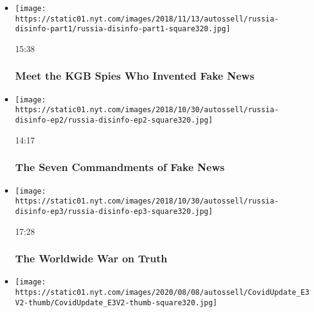 \begin{itemize}
\item
  \href{https://www.nytimes.com/video/opinion/100000006210828/russia-disinformation-fake-news.html?action=click\&module=video-series-bar\&region=header\&pgtype=Article\&playlistId=video/opinion}{}

  \texttt{[image: https://static01.nyt.com/images/2018/11/13/autossell/russia-disinfo-part1/russia-disinfo-part1-square320.jpg]}

  15:38

  \hypertarget{meet-the-kgb-spies-who-invented-fake-news}{%
  \subsubsection{Meet the KGB Spies Who Invented Fake
  News}\label{meet-the-kgb-spies-who-invented-fake-news}}
\item
  \href{https://www.nytimes.com/video/opinion/100000006188102/what-is-pizzagate.html?action=click\&module=video-series-bar\&region=header\&pgtype=Article\&playlistId=video/opinion}{}

  \texttt{[image: https://static01.nyt.com/images/2018/10/30/autossell/russia-disinfo-ep2/russia-disinfo-ep2-square320.jpg]}

  14:17

  \hypertarget{the-seven-commandments-of-fake-news}{%
  \subsubsection{The Seven Commandments of Fake
  News}\label{the-seven-commandments-of-fake-news}}
\item
  \href{https://www.nytimes.com/video/opinion/100000006188105/countering-disinformation-active-measures.html?action=click\&module=video-series-bar\&region=header\&pgtype=Article\&playlistId=video/opinion}{}

  \texttt{[image: https://static01.nyt.com/images/2018/10/30/autossell/russia-disinfo-ep3/russia-disinfo-ep3-square320.jpg]}

  17:28

  \hypertarget{the-worldwide-war-on-truth}{%
  \subsubsection{The Worldwide War on
  Truth}\label{the-worldwide-war-on-truth}}
\item
  \texttt{[image: https://static01.nyt.com/images/2020/08/08/autossell/CovidUpdate\_E3V2-thumb/CovidUpdate\_E3V2-thumb-square320.jpg]}


\end{itemize}
